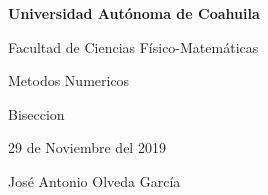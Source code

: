 \documentclass{article}
\begin{document}
\begin{center}
{\Large \textbf{Universidad Autónoma de Coahuila}}
\end{center}

\begin{center}
{\large Facultad de Ciencias Físico-Matemáticas}
\end{center}

\begin{center}
{\large Metodos Numericos}
\end{center}

\begin{center}
{\large Biseccion}
\end{center}

\begin{center}
{\large 29 de Noviembre del 2019}
\end{center}

\begin{center}
{\large José Antonio Olveda García}
\end{center}

\vspace{5mm}
\end{document}
